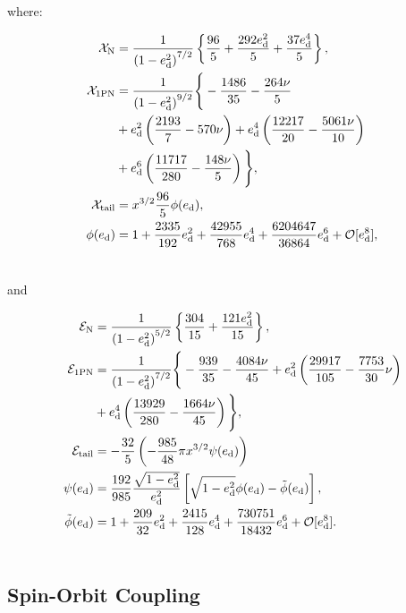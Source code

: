 \documentclass[usenatbib]{mnras}
\begin{document}
\noindent where:

\begin{align}
    \mathcal{X}_{\rm N} &= \frac{1}{\left(1-e_{\rm d}^2\right)^{7/2}} \left\{ \frac{96}{5}+\frac{292 
		e_{\rm d}^2}{5} +\frac{37 e_{\rm d}^4}{5}\right\},\\
	\mathcal{X}_{\rm{1PN}} &= \frac{1}{\left(1-e_{\rm d}^2\right)^{9/2}}\Bigg\{ -\frac{1486}{35} 
	-\frac{264 \nu}{5} \nonumber \\ &+e_{\rm d}^2 \left(\frac{2193}{7}-570 \nu \right) +e_{\rm d}^4 
		\left(\frac{12217}{20}-\frac{5061 \nu}{10}\right) \nonumber \\ &+e_{\rm d}^6 \left(\frac{11717}{280}-\frac{148 
		\nu}{5}\right) \Bigg\}, \\
	\mathcal{X}_{\rm{tail}}&=x^{3/2}\frac{96}{5}\phi (e_{\rm d}),\\
	\phi (e_{\rm d}) &=  1+\frac{2335}{192} e_{\rm d}^2 +\frac{42955}{768} e_{\rm d}^4 +\frac{6204647}{36864} e_{\rm d}^6 + \mathcal{O}[e_{\rm d}^8],\\ \nonumber
	\end{align}
	
\noindent and
	
	\begin{align}
	\mathcal{E}_{\rm N} &= \frac{1}{\left(1-e_{\rm d}^2\right)^{5/2}} \left\{ \frac{304}{15}+\frac{121 
		e_{\rm d}^2}{15} \right\},\\
	\mathcal{E}_{\rm{1PN}} &= \frac{1}{\left(1-e_{\rm d}^2\right)^{7/2}}\Bigg\{ -\frac{939}{35} 
		-\frac{4084 \nu}{45}\nonumber +e_{\rm d}^2 \left(\frac{29917}{105} - \frac{7753}{30} \nu \right)\nonumber \\ &+e_{\rm d}^4 
		\left(\frac{13929}{280} - \frac{1664 \nu}{45}\right) \Bigg\},\\
	\mathcal{E}_{\rm{tail}}&=-\frac{32}{5} \left(-\frac{985}{48} \pi  x^{3/2} \psi(e_{\rm{d}})\right)\\
		\psi (e_{\rm d}) &=  \frac{192}{985} \frac{\sqrt{1-e_{\rm{d}}^2}}{e_{\rm{d}}^2} \left[\sqrt{1-e_{\rm{d}}^2} \phi(e_{\rm{d}}) 
		-\tilde{\phi}(e_{\rm{d}})\right],\\
	\tilde{\phi}(e_{\rm{d}})&=1+\frac{209}{32}  e_{\rm{d}}^2+\frac{2415}{128} e_{\rm{d}}^4 +\frac{730751}{18432} 
		e_{\rm{d}}^6+ \mathcal{O}[e_{\rm d}^8].\\ \nonumber
\end{align}

\subsection*{Spin-Orbit Coupling}
\end{document}

